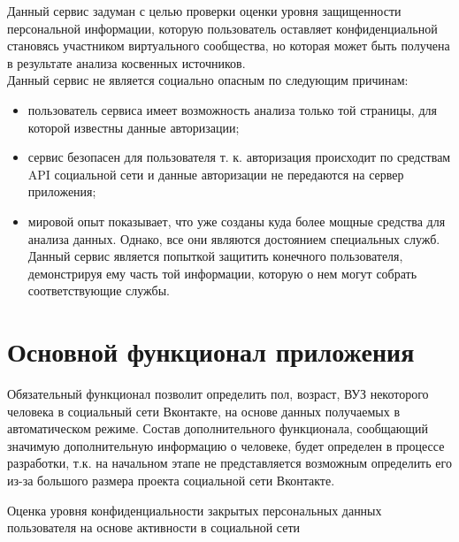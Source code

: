 Данный сервис задуман с целью проверки оценки уровня защищенности персональной информации, которую пользователь оставляет конфиденциальной становясь участником виртуального сообщества, но которая может быть получена в результате анализа косвенных источников.%
\\

Данный сервис не является социально опасным по следующим причинам:
\begin{itemize}
\item пользователь сервиса имеет возможность анализа только той страницы, для которой известны данные авторизации;
\item сервис безопасен для пользователя т. к. авторизация происходит по средствам  API  социальной сети и данные авторизации не передаются на сервер приложения; 
\item мировой опыт показывает, что уже созданы куда более мощные средства для анализа данных. Однако, все они являются достоянием специальных служб. Данный сервис является попыткой защитить конечного пользователя, демонстрируя ему часть той информации, которую о нем могут собрать соответствующие службы.
\end{itemize}

\section{Основной функционал приложения}
Обязательный функционал позволит определить пол, возраст, ВУЗ некоторого человека в социальный сети Вконтакте, на основе данных получаемых в автоматическом режиме. Состав дополнительного функционала, сообщающий значимую дополнительную информацию о человеке,  будет определен в процессе разработки, т.к. на начальном этапе не представляется возможным определить его из-за большого размера проекта социальной сети Вконтакте.

Оценка уровня конфиденциальности закрытых персональных данных пользователя на основе активности в социальной сети

